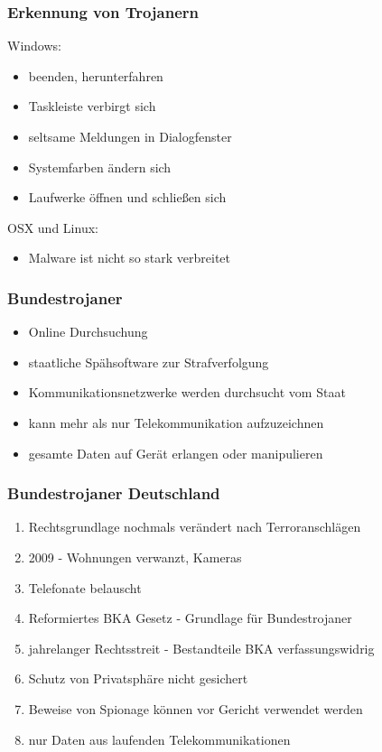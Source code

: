 \documentclass{beamer}
\begin{document}
\begin{frame}
	\frametitle{Erkennung von Trojanern}
	Windows:
	\begin{itemize}
		\item beenden, herunterfahren
		\item Taskleiste verbirgt sich
		\item seltsame Meldungen in Dialogfenster
		\item Systemfarben ändern sich
		\item Laufwerke öffnen und schließen sich
	\end{itemize}
	OSX und Linux:
	\begin{itemize}
		\item Malware ist nicht so stark verbreitet
	\end{itemize}
\end{frame}


\begin{frame}
	\frametitle{Bundestrojaner}
	\begin{itemize}
		\item Online Durchsuchung
		\item staatliche Spähsoftware zur Strafverfolgung
		\item Kommunikationsnetzwerke werden durchsucht vom Staat
		\item kann mehr als nur Telekommunikation aufzuzeichnen
		\item gesamte Daten auf Gerät erlangen oder manipulieren
	\end{itemize}
\end{frame}

\begin{frame}
	\frametitle{Bundestrojaner Deutschland}
	\begin{enumerate}
		\item Rechtsgrundlage nochmals verändert nach Terroranschlägen
		\item 2009 - Wohnungen verwanzt, Kameras
		\item Telefonate belauscht
		\item Reformiertes BKA Gesetz - Grundlage für Bundestrojaner
		\item jahrelanger Rechtsstreit - Bestandteile BKA verfassungswidrig 
		\item Schutz von Privatsphäre nicht gesichert
		\item Beweise von Spionage können vor Gericht verwendet werden
		\item nur Daten aus laufenden Telekommunikationen 
	\end{enumerate}
\end{frame}
\end{document}
